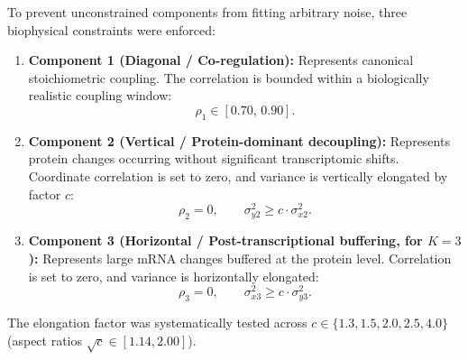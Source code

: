 \documentclass[11pt,a4paper]{article}
\begin{document}
To prevent unconstrained components from fitting arbitrary noise, three biophysical constraints were enforced:
\begin{enumerate}[noitemsep,topsep=2pt]
    \item \textbf{Component 1 (Diagonal / Co-regulation):} Represents canonical stoichiometric coupling. The correlation is bounded within a biologically realistic coupling window:
    \begin{equation}
    \rho_1 \in [0.70, \, 0.90].
    \end{equation}
    \item \textbf{Component 2 (Vertical / Protein-dominant decoupling):} Represents protein changes occurring without significant transcriptomic shifts. Coordinate correlation is set to zero, and variance is vertically elongated by factor $c$:
    \begin{equation}
    \rho_2 = 0, \qquad \sigma_{y2}^2 \ge c \cdot \sigma_{x2}^2.
    \end{equation}
    \item \textbf{Component 3 (Horizontal / Post-transcriptional buffering, for $K=3$):} Represents large mRNA changes buffered at the protein level. Correlation is set to zero, and variance is horizontally elongated:
    \begin{equation}
    \rho_3 = 0, \qquad \sigma_{x3}^2 \ge c \cdot \sigma_{y3}^2.
    \end{equation}
\end{enumerate}
The elongation factor was systematically tested across $c \in \{1.3, 1.5, 2.0, 2.5, 4.0\}$ (aspect ratios $\sqrt{c} \in [1.14, 2.00]$).
\end{document}
